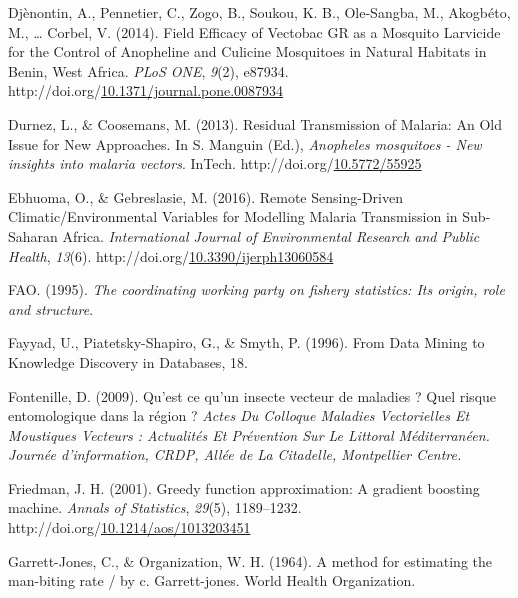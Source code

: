 \documentclass[12pt,twoside]{reedthesis}
\newlength{\cslhangindent}
\newenvironment{CSLReferences}[2] %
 {%
  \setlength{\parindent}{0pt}
  \ifodd #1 \everypar{\setlength{\hangindent}{\cslhangindent}}\ignorespaces\fi
  \ifnum #2 > 0
  \setlength{\parskip}{#2\baselineskip}
  \fi
 }%
 {}
\begin{document}
\begin{CSLReferences}{1}{0}
\leavevmode{}%
Djènontin, A., Pennetier, C., Zogo, B., Soukou, K. B., Ole-Sangba, M., Akogbéto, M., \ldots{} Corbel, V. (2014). Field {Efficacy} of {Vectobac} {GR} as a {Mosquito} {Larvicide} for the {Control} of {Anopheline} and {Culicine} {Mosquitoes} in {Natural} {Habitats} in {Benin}, {West} {Africa}. \emph{PLoS ONE}, \emph{9}(2), e87934. http://doi.org/\href{https://doi.org/10.1371/journal.pone.0087934}{10.1371/journal.pone.0087934}

\leavevmode{}%
Durnez, L., \& Coosemans, M. (2013). Residual {Transmission} of {Malaria}: {An} {Old} {Issue} for {New} {Approaches}. In S. Manguin (Ed.), \emph{Anopheles mosquitoes - {New} insights into malaria vectors}. InTech. http://doi.org/\href{https://doi.org/10.5772/55925}{10.5772/55925}

\leavevmode{}%
Ebhuoma, O., \& Gebreslasie, M. (2016). Remote {Sensing}-{Driven} {Climatic}/{Environmental} {Variables} for {Modelling} {Malaria} {Transmission} in {Sub}-{Saharan} {Africa}. \emph{International Journal of Environmental Research and Public Health}, \emph{13}(6). http://doi.org/\href{https://doi.org/10.3390/ijerph13060584}{10.3390/ijerph13060584}

\leavevmode{}%
FAO. (1995). \emph{The coordinating working party on fishery statistics: Its origin, role and structure}.

\leavevmode{}%
Fayyad, U., Piatetsky-Shapiro, G., \& Smyth, P. (1996). From {Data} {Mining} to {Knowledge} {Discovery} in {Databases}, 18.

\leavevmode{}%
Fontenille, D. (2009). Qu'est ce qu'un insecte vecteur de maladies ? Quel risque entomologique dans la région ? \emph{Actes Du Colloque Maladies Vectorielles Et Moustiques Vecteurs : Actualités Et Prévention Sur Le Littoral Méditerranéen. Journée d'information, CRDP, Allée de La Citadelle, Montpellier Centre.}

\leavevmode{}%
Friedman, J. H. (2001). Greedy function approximation: {A} gradient boosting machine. \emph{Annals of Statistics}, \emph{29}(5), 1189--1232. http://doi.org/\href{https://doi.org/10.1214/aos/1013203451}{10.1214/aos/1013203451}

\leavevmode{}%
Garrett-Jones, C., \& Organization, W. H. (1964). A method for estimating the man-biting rate / by c. Garrett-jones. World Health Organization.


\end{CSLReferences}
\end{document}

